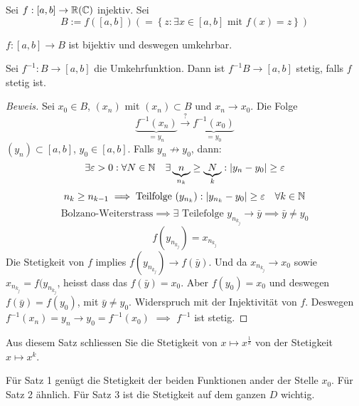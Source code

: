 \begin{Sat}
  Sei $f:\left[ a,b \right]\to\mathbb{R}(\mathbb{C})$ injektiv. Sei
  \[B:=f\left( \left[ a,b \right] \right)\left( =\left\{ z:\exists x\in\left[ a,b \right]\text{ mit } f(x)=z \right\} \right)\]
  \begin{Bem}
    $f:\left[ a,b \right]\to B$ ist bijektiv und deswegen umkehrbar.
  \end{Bem}
  Sei $f^{-1}:B\to\left[ a,b \right]$ die Umkehrfunktion. Dann ist $f^{-1}B\to \left[ a,b \right]$ stetig, falls $f$ stetig ist.
\end{Sat}
\begin{proof}[Beweis]
  Sei $x_0\in B$, $(x_n)$ mit $(x_n)\subset B$ und $x_n\to x_0$. Die Folge
  \[\underbrace{f^{-1}(x_n)}_{=y_n}\stackrel{?}{\to}\underbrace{f^{-1}(x_0)}_{=y_0}\]
  $(y_n)\subset\left[ a,b \right]$, $y_0\in\left[ a,b \right]$. Falls $y_n\not\to y_0$, dann:
  \[\exists\varepsilon>0: \forall N\in\mathbb{N}\quad 
\exists \underbrace{n}_{n_k}\geq \underbrace{N}_{k}: \mathopen| y_n-y_0 \mathclose|\geq\varepsilon\]
  \[n_k\geq n_{k-1}\implies\text{Teilfolge } (y_{n_k}): \mathopen| y_{n_k}-y_0 \mathclose|\geq 
\varepsilon\quad \forall k\in \mathbb{N}\]
  \[\text{Bolzano-Weiterstrass}\implies \exists \mbox{ Teilefolge }y_{n_{k_j}}\to\bar{y}\implies \bar{y}\neq y_0\]
  \[f(y_{n_{k_j}})=x_{n_{k_j}}\]
Die Stetigkeit von $f$ implies $f(y_{n_{k_j}})\to f(\bar y)$. 
Und da $x_{n_{k_j}}\to x_0$ sowie  $x_{n_{k_j}} = f(y_{n_{k_j}}$, heisst 
dass das $f(\bar y)=x_0$. Aber $f(y_0)=x_0$ und deswegen $ f(\bar y)=f(y_0)$,
mit $\bar y\neq y_0$. Widerspruch mit der Injektivität von $f$. 
Deswegen $f^{-1}(x_n)=y_n\to y_0=f^{-1}(x_0)$ $\implies$ $f^{-1}$ ist stetig.
\end{proof}
\begin{Bem}
  Aus diesem Satz schliessen Sie die Stetigkeit von $x\mapsto x^{\frac{1}{k}}$ von der Stetigkeit $x\mapsto x^k$.
\end{Bem}
\begin{Bem}
  Für Satz 1 genügt die Stetigkeit der beiden Funktionen ander der Stelle $x_0$. Für Satz 2 ähnlich. Für Satz 3 ist die Stetigkeit auf dem ganzen $D$ wichtig.
\end{Bem}
